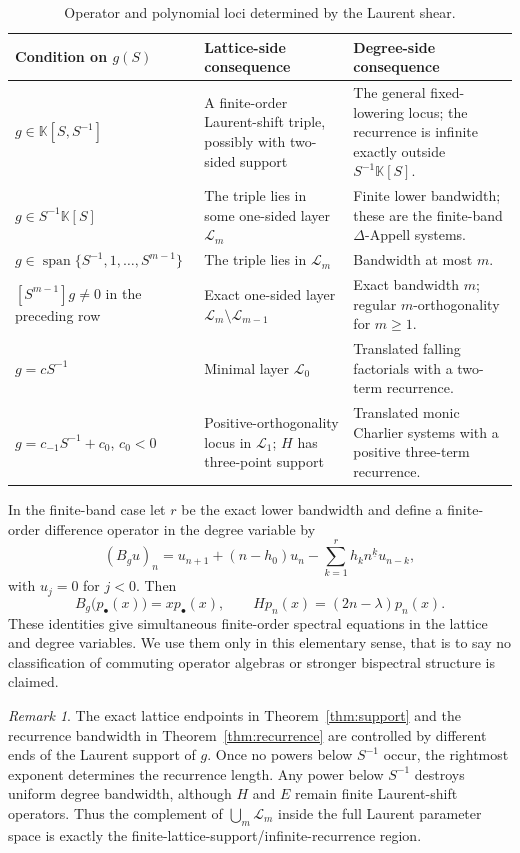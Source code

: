 \documentclass[11pt,reqno]{amsart}
\numberwithin{equation}{section}
\theoremstyle{definition}
\theoremstyle{remark}
\newtheorem{remark}[theorem]{Remark}
\newcommand{\K}{\mathbb K}
\newcommand{\calL}{\mathcal L}
\newcommand{\Span}{\operatorname{span}}
\newcommand{\fall}[2]{#1^{\underline{#2}}}
\begin{document}
\begin{table}[t]
\centering
\caption{Operator and polynomial loci determined by the Laurent shear.}
\label{tab:loci}
\footnotesize
\renewcommand{\arraystretch}{1.2}
\begin{tabularx}{\textwidth}{>{\raggedright\arraybackslash}p{}>{\raggedright\arraybackslash}p{}X}
\toprule
Condition on $g(S)$ & Lattice-side consequence & Degree-side consequence\\
\midrule
$g\in\K[S,S^{-1}]$
& A finite-order Laurent-shift triple, possibly with two-sided support
& The general fixed-lowering locus; the recurrence is infinite exactly outside $S^{-1}\K[S]$.\\
$g\in S^{-1}\K[S]$
& The triple lies in some one-sided layer $\calL_m$
& Finite lower bandwidth; these are the finite-band $\Delta$-Appell systems.\\
$g\in\Span\{S^{-1},1,\ldots,S^{m-1}\}$
& The triple lies in $\calL_m$
& Bandwidth at most $m$.\\
$[S^{m-1}]g\ne0$ in the preceding row
& Exact one-sided layer $\calL_m\setminus\calL_{m-1}$
& Exact bandwidth $m$; regular $m$-orthogonality for $m\ge1$.\\
$g=cS^{-1}$
& Minimal layer $\calL_0$
& Translated falling factorials with a two-term recurrence.\\
$g=c_{-1}S^{-1}+c_0$, $c_0<0$
& Positive-orthogonality locus in $\calL_1$; $H$ has three-point support
& Translated monic Charlier systems with a positive three-term recurrence.\\
\bottomrule
\end{tabularx}
\end{table}

In the finite-band case let $r$ be the exact lower bandwidth and define a finite-order difference operator in the degree variable by
\begin{equation}\label{eq:Bg}
 (B_gu)_n=u_{n+1}+(n-h_0)u_n-
 \sum_{k=1}^{r}h_k\fall{n}{k}u_{n-k},
\end{equation}
with $u_j=0$ for $j<0$.  Then
\[
 B_g\bigl(p_\bullet(x)\bigr)=x p_\bullet(x),
 \qquad
 Hp_n(x)=(2n-\lambda)p_n(x).
\]
These identities give simultaneous finite-order spectral equations in the lattice and degree variables.  We use them only in this elementary sense, that is to say no classification of commuting operator algebras or stronger bispectral structure is claimed.

\begin{remark}\label{rem:asymmetry}
The exact lattice endpoints in Theorem~\ref{thm:support} and the recurrence bandwidth in Theorem~\ref{thm:recurrence} are controlled by different ends of the Laurent support of $g$.  Once no powers below $S^{-1}$ occur, the rightmost exponent determines the recurrence length.  Any power below $S^{-1}$ destroys uniform degree bandwidth, although $H$ and $E$ remain finite Laurent-shift operators.  Thus the complement of $\bigcup_m\calL_m$ inside the full Laurent parameter space is exactly the finite-lattice-support/infinite-recurrence region.
\end{remark}
\end{document}
